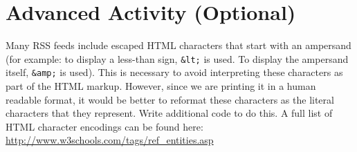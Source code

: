 \documentclass[12pt]{scrartcl}
\begin{document}
\section{Advanced Activity (Optional)}

Many RSS feeds include escaped HTML characters that start with an 
ampersand (for example: to display a less-than sign, \texttt{&lt;} 
is used.  To display the ampersand itself, \texttt{&amp;} is used).  
This is necessary to avoid interpreting these characters as part of the HTML 
markup.  However, since we are printing it in a human readable format, 
it would be better to reformat these characters as the literal characters 
that they represent.  Write additional code to do this.  A full list of HTML 
character encodings can be found here: \url{http://www.w3schools.com/tags/ref_entities.asp}
\end{document}
